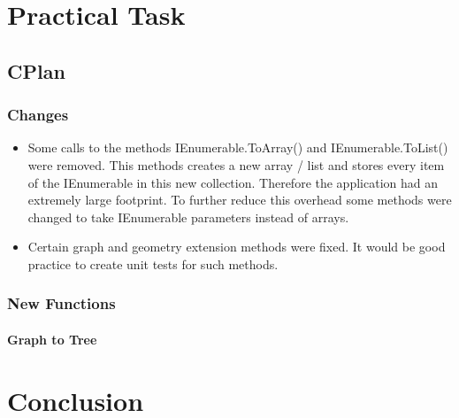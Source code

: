 \documentclass[11pt, a4paper]{report}
\begin{document}
\pagebreak
\chapter{Practical Task}
\section{CPlan}
\subsection{Changes}
\begin{itemize}
    \item Some calls to the methods IEnumerable.ToArray() and IEnumerable.ToList() were removed. This methods creates a new array / list and stores every item of the IEnumerable in this new collection. Therefore the application had an extremely large footprint. To further reduce this overhead some methods were changed to take IEnumerable parameters instead of arrays.
    \item Certain graph and geometry extension methods were fixed. It would be good practice to create unit tests for such methods.
\end{itemize}


\subsection{New Functions}
\subsubsection{Graph to Tree}


\chapter{Conclusion}


\appendix
\glsaddall
\printglossaries
\end{document}
